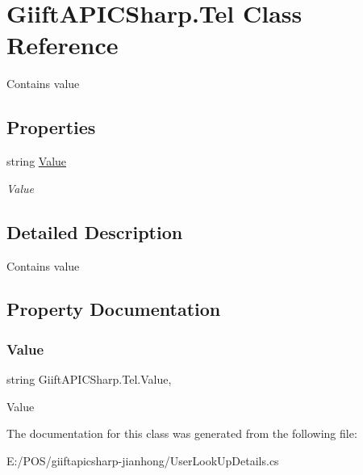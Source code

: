 \hypertarget{class_giift_a_p_i_c_sharp_1_1_tel}{}\section{Giift\+A\+P\+I\+C\+Sharp.\+Tel Class Reference}
\label{class_giift_a_p_i_c_sharp_1_1_tel}


Contains value  


\subsection*{Properties}
\begin{DoxyCompactItemize}
\item 
string \hyperlink{class_giift_a_p_i_c_sharp_1_1_tel_ae83533f527dc38e4701196ac2146789c}{Value}
\begin{DoxyCompactList}\small\item\em Value \end{DoxyCompactList}\end{DoxyCompactItemize}


\subsection{Detailed Description}
Contains value 



\subsection{Property Documentation}
\mbox{\label{class_giift_a_p_i_c_sharp_1_1_tel_ae83533f527dc38e4701196ac2146789c}} 
\subsubsection{\texorpdfstring{Value}{Value}}
{\footnotesize\ttfamily string Giift\+A\+P\+I\+C\+Sharp.\+Tel.\+Value\hspace{0.3cm}{\ttfamily [get]}, {\ttfamily [set]}}



Value 



The documentation for this class was generated from the following file\+:\begin{DoxyCompactItemize}
\item 
E\+:/\+P\+O\+S/giiftapicsharp-\/jianhong/User\+Look\+Up\+Details.\+cs\end{DoxyCompactItemize}
